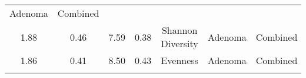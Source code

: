 \documentclass[12pt,]{article}
\begin{document}
\begin{longtable}[]{@{}ccccccc@{}}
\begin{minipage}[t]{0.09\columnwidth}
Adenoma\strut
\end{minipage} & \begin{minipage}[t]{0.11\columnwidth}\centering\strut
Combined\strut
\end{minipage}\tabularnewline
\begin{minipage}[t]{0.09\columnwidth}\centering\strut
1.88\strut
\end{minipage} & \begin{minipage}[t]{0.16\columnwidth}\centering\strut
0.46\strut
\end{minipage} & \begin{minipage}[t]{0.16\columnwidth}\centering\strut
7.59\strut
\end{minipage} & \begin{minipage}[t]{0.07\columnwidth}\centering\strut
0.38\strut
\end{minipage} & \begin{minipage}[t]{0.14\columnwidth}\centering\strut
Shannon Diversity\strut
\end{minipage} & \begin{minipage}[t]{0.09\columnwidth}\centering\strut
Adenoma\strut
\end{minipage} & \begin{minipage}[t]{0.11\columnwidth}\centering\strut
Combined\strut
\end{minipage}\tabularnewline
\begin{minipage}[t]{0.09\columnwidth}\centering\strut
1.86\strut
\end{minipage} & \begin{minipage}[t]{0.16\columnwidth}\centering\strut
0.41\strut
\end{minipage} & \begin{minipage}[t]{0.16\columnwidth}\centering\strut
8.50\strut
\end{minipage} & \begin{minipage}[t]{0.07\columnwidth}\centering\strut
0.43\strut
\end{minipage} & \begin{minipage}[t]{0.14\columnwidth}\centering\strut
Evenness\strut
\end{minipage} & \begin{minipage}[t]{0.09\columnwidth}\centering\strut
Adenoma\strut
\end{minipage} & \begin{minipage}[t]{0.11\columnwidth}\centering\strut
Combined\strut
\end{minipage}\tabularnewline
\begin{minipage}[t]{0.09\columnwidth}\centering\strut

\end{minipage}
\end{longtable}
\end{document}
